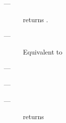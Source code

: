\precond
\begin{description}
    \item[---] \emptyfn returns \true.
\end{description}

\effects
\begin{description}
    \item[---] Equivalent to 
\end{description}

\returns
\begin{description}
    \item[---] \this
\end{description}


\mandates
\begin{description}
    \item[---] 
\end{description}

\precond
\begin{description}
    \item[---] \canresume returns \true
\end{description}

\newcommand{\continuation}{\cpp{continuation}}

